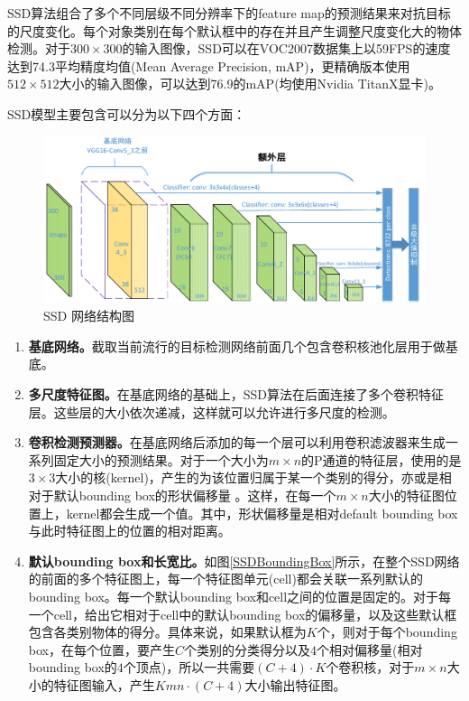 SSD算法组合了多个不同层级不同分辨率下的feature map的预测结果来对抗目标的尺度变化。每个对象类别在每个默认框中的存在并且产生调整尺度变化大的物体检测。对于$300\times300$的输入图像，SSD可以在VOC2007数据集上以59FPS的速度达到74.3平均精度均值(Mean Average Precision, mAP)，更精确版本使用$512\times512$大小的输入图像，可以达到76.9的mAP(均使用Nvidia TitanX显卡)。

SSD模型主要包含可以分为以下四个方面：
\begin{figure}[h]
    \centering
    \includegraphics[width=14cm]{figures/SSD网络结构图.pdf}
    \caption{SSD 网络结构图}\label{SSDStruct}
\end{figure}


\begin{enumerate}[1)]
\item \textbf{基底网络。}截取当前流行的目标检测网络前面几个包含卷积核池化层用于做基底。
\item \textbf{多尺度特征图。}在基底网络的基础上，SSD算法在后面连接了多个卷积特征层。这些层的大小依次递减，这样就可以允许进行多尺度的检测。
\item \textbf{卷积检测预测器。}在基底网络后添加的每一个层可以利用卷积滤波器来生成一系列固定大小的预测结果。对于一个大小为$m\times n$的P通道的特征层，使用的是$3\times3$大小的核(kernel)，产生的为该位置归属于某一个类别的得分，亦或是相对于默认bounding box的形状偏移量 。这样，在每一个$m\times n$大小的特征图位置上，kernel都会生成一个值。其中，形状偏移量是相对default bounding box与此时特征图上的位置的相对距离。
\item \textbf{默认bounding box和长宽比。}如图\ref{SSDBoundingBox}所示，在整个SSD网络的前面的多个特征图上，每一个特征图单元(cell)都会关联一系列默认的bounding box。每一个默认bounding box和cell之间的位置是固定的。对于每一个cell，给出它相对于cell中的默认bounding box的偏移量，以及这些默认框包含各类别物体的得分。具体来说，如果默认框为$K$个，则对于每个bounding box，在每个位置，要产生$C$个类别的分类得分以及$4$个相对偏移量(相对bounding box的$4$个顶点)，所以一共需要$(C+4)\cdot{K}$个卷积核，对于$m\times n$大小的特征图输入，产生$Kmn\cdot{(C+4)}$大小输出特征图。
\end{enumerate}

